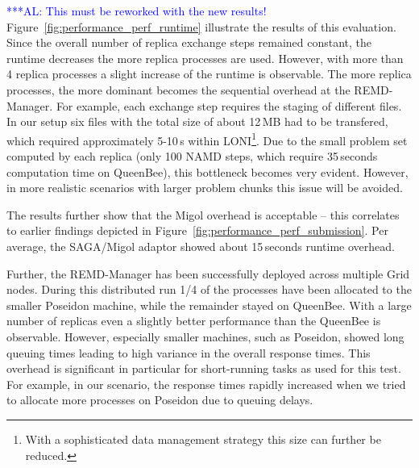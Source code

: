 \documentclass[conference,final]{IEEEtran}
\newcommand{\alnote}[1]{ {\textcolor{blue} { ***AL: #1 }}}
\newcommand{\alnote}[1]{}
\begin{document}
\alnote{This must be reworked with the new results!}
Figure~\ref{fig:performance_perf_runtime} illustrate the results of
this evaluation. Since the overall number of replica exchange steps remained constant,
the runtime decreases the more replica processes are used. 
However, with more than 4 replica processes a slight increase 
of the runtime is observable. 
The more replica processes, the more dominant becomes the sequential overhead 
at the REMD-Manager. For example, each exchange step requires the staging of 
different files. In our setup six files with the total size of about 12\,MB had to be transfered, which
required approximately 5-10\,s within LONI\footnote{With a sophisticated data management strategy this size can further be reduced.}. 
Due to the small problem set computed by each replica (only 100 NAMD steps, which require 35\,seconds computation
time on QueenBee), this bottleneck becomes very evident. However, in
more realistic scenarios with larger problem chunks this issue will be
avoided.

The results further show that the Migol overhead is acceptable -- this   
correlates to earlier findings depicted in Figure~\ref{fig:performance_perf_submission}. 
Per average, the SAGA/Migol adaptor showed about 15\,seconds runtime overhead. 



Further, the REMD-Manager has been successfully deployed across
multiple Grid nodes. During this distributed run 1/4 of the processes have been 
allocated to the smaller Poseidon machine, while the remainder stayed on QueenBee.
With a large number of replicas even a slightly better performance than the QueenBee 
is observable. However, especially smaller machines, such as Poseidon, showed long queuing times 
leading to high variance in the overall response times. This overhead is significant in particular 
for short-running tasks as used for this test. For example, in our scenario, 
the response times rapidly increased when we tried to allocate 
more processes on Poseidon due to queuing delays. 
\end{document}
